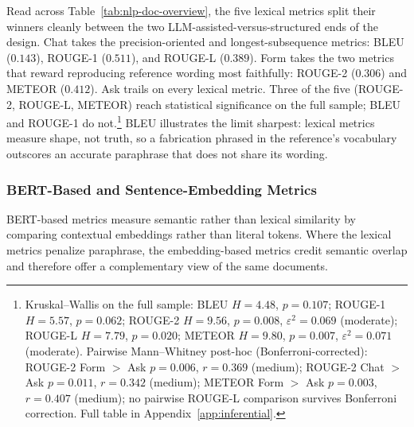 Read across Table~\ref{tab:nlp-doc-overview}, the five lexical
metrics split their winners cleanly between the two
LLM-assisted-versus-structured ends of the design. Chat takes the
precision-oriented and longest-subsequence metrics: BLEU
($0.143$), ROUGE-1 ($0.511$), and ROUGE-L ($0.389$). Form takes
the two metrics that reward reproducing reference wording most
faithfully: ROUGE-2 ($0.306$) and METEOR ($0.412$). Ask trails on
every lexical metric. Three of the five (ROUGE-2, ROUGE-L,
METEOR) reach statistical significance on the full sample; BLEU
and ROUGE-1 do not.\footnote{Kruskal--Wallis on the full sample:
BLEU $H = 4.48$, $p = 0.107$; ROUGE-1 $H = 5.57$, $p = 0.062$;
ROUGE-2 $H = 9.56$, $p = 0.008$, $\varepsilon^2 = 0.069$
(moderate); ROUGE-L $H = 7.79$, $p = 0.020$; METEOR $H = 9.80$,
$p = 0.007$, $\varepsilon^2 = 0.071$ (moderate). Pairwise
Mann--Whitney post-hoc (Bonferroni-corrected): ROUGE-2 Form $>$
Ask $p = 0.006$, $r = 0.369$ (medium); ROUGE-2 Chat $>$ Ask
$p = 0.011$, $r = 0.342$ (medium); METEOR Form $>$ Ask $p =
0.003$, $r = 0.407$ (medium); no pairwise ROUGE-L comparison
survives Bonferroni correction. Full table in
Appendix~\ref{app:inferential}.} BLEU illustrates the limit
sharpest: lexical metrics measure shape, not truth, so a
fabrication phrased in the reference's vocabulary outscores an
accurate paraphrase that does not share its wording.

\subsubsection{BERT-Based and Sentence-Embedding Metrics}
\label{ssec:nlp-doc-bert}

BERT-based metrics measure semantic rather than lexical similarity
by comparing contextual embeddings rather than literal tokens.
Where the lexical metrics penalize paraphrase, the embedding-based
metrics credit semantic overlap and therefore offer a
complementary view of the same documents.

